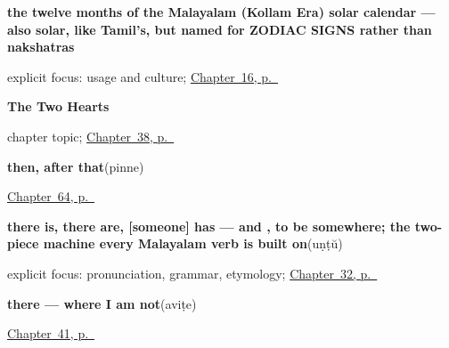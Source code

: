 \noindent\begin{minipage}[t]{\linewidth}
\raggedright
\textbf{the twelve months of the Malayalam (Kollam Era) solar calendar — also solar, like Tamil's, but named for ZODIAC SIGNS rather than nakshatras}\enspace\emph{           }\par
\footnotesize explicit focus: usage and culture; \hyperref[ch:ml-traditional-months]{Chapter~16, p.~\pageref*{ch:ml-traditional-months}}
\end{minipage}\par\smallskip

\noindent\begin{minipage}[t]{\linewidth}
\raggedright
\textbf{The Two Hearts}\par
\footnotesize chapter topic; \hyperref[ch:ml-two-hearts]{Chapter~38, p.~\pageref*{ch:ml-two-hearts}}
\end{minipage}\par\smallskip

\noindent\begin{minipage}[t]{\linewidth}
\raggedright
\textbf{then, after that}\enspace\emph{}\enspace(pinne)\par
\footnotesize \hyperref[ch:ml-five-words-that-join]{Chapter~64, p.~\pageref*{ch:ml-five-words-that-join}}
\end{minipage}\par\smallskip

\noindent\begin{minipage}[t]{\linewidth}
\raggedright
\textbf{there is, there are, {[}someone{]} has — and , to be somewhere; the two-piece machine every Malayalam verb is built on}\enspace\emph{}\enspace(uṇṭŭ)\par
\footnotesize explicit focus: pronunciation, grammar, etymology; \hyperref[ch:ml-core-verbs]{Chapter~32, p.~\pageref*{ch:ml-core-verbs}}
\end{minipage}\par\smallskip

\noindent\begin{minipage}[t]{\linewidth}
\raggedright
\textbf{there — where I am not}\enspace\emph{}\enspace(aviṭe)\par
\footnotesize \hyperref[ch:ml-pointing-and-asking]{Chapter~41, p.~\pageref*{ch:ml-pointing-and-asking}}
\end{minipage}\par\smallskip

